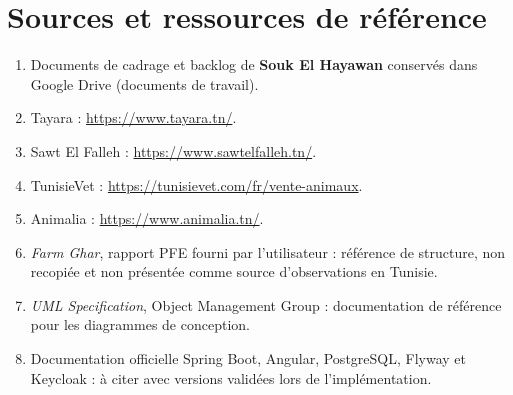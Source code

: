 \chapter{Sources et ressources de référence}
\begin{enumerate}
\item Documents de cadrage et backlog de \textbf{Souk El Hayawan} conservés dans Google Drive (documents de travail).
\item Tayara : \url{https://www.tayara.tn/}.
\item Sawt El Falleh : \url{https://www.sawtelfalleh.tn/}.
\item TunisieVet : \url{https://tunisievet.com/fr/vente-animaux}.
\item Animalia : \url{https://www.animalia.tn/}.
\item \textit{Farm Ghar}, rapport PFE fourni par l’utilisateur : référence de structure, non recopiée et non présentée comme source d’observations en Tunisie.
\item \textit{UML Specification}, Object Management Group : documentation de référence pour les diagrammes de conception.
\item Documentation officielle Spring Boot, Angular, PostgreSQL, Flyway et Keycloak : à citer avec versions validées lors de l’implémentation.
\end{enumerate}
